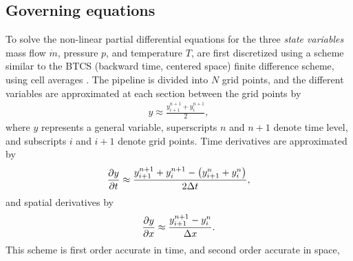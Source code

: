 \subsection{Governing equations}
\label{subsec:governingNumerical}
To solve the non-linear partial differential equations for the three \emph{state variables} mass flow $\dot m$, pressure $p$, and temperature $T$,  are first discretized using a scheme similar to the BTCS (backward time, centered space) finite difference scheme, using cell averages \cite{Kiuchi1993Implicit,Abbaspour2004Dynamic}. The pipeline is divided into $N$ grid points, and the different variables are approximated at each section between the grid points by
\begin{align}
    y \approx \frac{y^{n+1}_{i+1} + y^{n+1}_{i}}{2}
, \label{eq:variablesScheme}
\end{align}
where $y$ represents a general variable, superscripts $n$ and $n+1$ denote time level, and subscripts $i$ and $i+1$ denote grid points. Time derivatives are approximated by
\begin{align}
    \pdt{y} \approx 
    \frac{y^{n+1}_{i+1} + y^{n+1}_{i} - \del{y^{n}_{i+1} + y^{n}_{i}}}{2\Delta t}
, \label{eq:timeScheme}
\end{align}
and spatial derivatives by
\begin{align}
    \pdx{y} \approx
    \frac{y^{n+1}_{i+1} - y^{n}_{i}}{\Delta x}
. \label{eq:spatialScheme}
\end{align}
This scheme is first order accurate in time, and second order accurate in space, 

